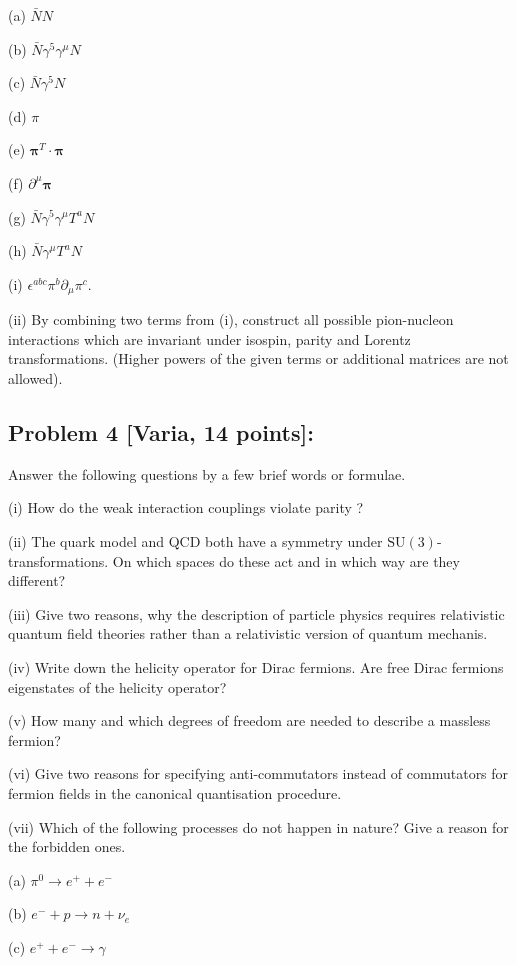 \documentclass[10pt, letterpaper]{article}
\begin{document}
(a) $\bar{N} N$

(b) $\bar{N} \gamma^5 \gamma^\mu N$

(c) $\bar{N} \gamma^5 N$

(d) $\pi$

(e) $\boldsymbol{\pi}^T \cdot \boldsymbol{\pi}$

(f) $\partial^\mu \boldsymbol{\pi}$

(g) $\bar{N} \gamma^5 \gamma^\mu T^a N$

(h) $\bar{N} \gamma^\mu T^a N$

(i) $\epsilon^{a b c} \pi^b \partial_\mu \pi^c$.

(ii) By combining two terms from (i), construct all possible pion-nucleon interactions which are invariant under isospin, parity and Lorentz transformations. (Higher powers of the given terms or additional matrices are not allowed).


\subsection{Problem 4 [Varia, 14 points]:}

Answer the following questions by a few brief words or formulae.

(i) How do the weak interaction couplings violate parity ?

(ii) The quark model and QCD both have a symmetry under $\mathrm{SU}(3)$-transformations. On which spaces do these act and in which way are they different?

(iii) Give two reasons, why the description of particle physics requires relativistic quantum field theories rather than a relativistic version of quantum mechanis.

(iv) Write down the helicity operator for Dirac fermions. Are free Dirac fermions eigenstates of the helicity operator?

(v) How many and which degrees of freedom are needed to describe a massless fermion?

(vi) Give two reasons for specifying anti-commutators instead of commutators for fermion fields in the canonical quantisation procedure.

(vii) Which of the following processes do not happen in nature? Give a reason for the forbidden ones.

(a) $\pi^0 \rightarrow e^{+}+e^{-}$

(b) $e^{-}+p \rightarrow n+\nu_e$

(c) $e^{+}+e^{-} \rightarrow \gamma$
\end{document}
